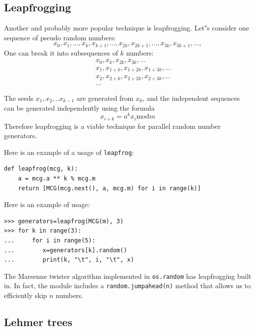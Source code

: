 \documentclass[justified, sixbynine]{tufte-book}
\def\ft{\small\tt}
\theoremstyle{plain}%
\newtheorem * {corollary}{Corollary}
\theoremstyle{definition}
\theoremstyle{remark}
\newtheorem * {remark}{Remark}
\newtheorem * {note}{Note}
\begin{document}
\begin{fullwidth}
\goodbreak\subsection{Leapfrogging}

Another and probably more popular technique is leapfrogging.
Let"s consider one sequence of pseudo random numbers:
\begin{equation}
x_0, x_1, ..., x_k, x_{k+1}, ..., x_{2k}, x_{2k+1}, ..., x_{3k}, x_{3k+1}, ..., 
\end{equation}
One can break it into subsequences of $k$ numbers:
\begin{eqnarray}
&&x_0, x_k, x_{2k}, x_{3k}, ... \\
&&x_1, x_{1+k}, x_{1+2k}, x_{1+3k}, ... \\
&&x_2, x_{2+k}, x_{2+2k}, x_{2+3k}, ... \\
&&...
\end{eqnarray}

The seeds $x_1, x_2, ..x_{k-1}$ are generated from $x_0$, and the independent
sequences can be generated independently using the formula
\begin{equation}
x_{i+k}=a^kx_i\textrm{mod}m
\end{equation}
Therefore leapfrogging is a viable technique for parallel random number
generators.

Here is an example of a usage of {\ft leapfrog}:

\begin{lstlisting}[caption={in file: {\ft nlib.py}}]
def leapfrog(mcg, k):
    a = mcg.a ** k % mcg.m
    return [MCG(mcg.next(), a, mcg.m) for i in range(k)]
\end{lstlisting}

Here is an example of usage:
\begin{lstlisting}
>>> generators=leapfrog(MCG(m), 3)
>>> for k in range(3):
...     for i in range(5):
...        x=generators[k].random()
...        print(k, "\t", i, "\t", x)
\end{lstlisting}

The Marsenne twister algorithm implemented in {\ft os.random} has leapfrogging built in. In fact, the module includes a {\ft random.jumpahead(n)} method that allows us to efficiently skip $n$ numbers.

\goodbreak\subsection{Lehmer trees}


\end{fullwidth}
\end{document}
